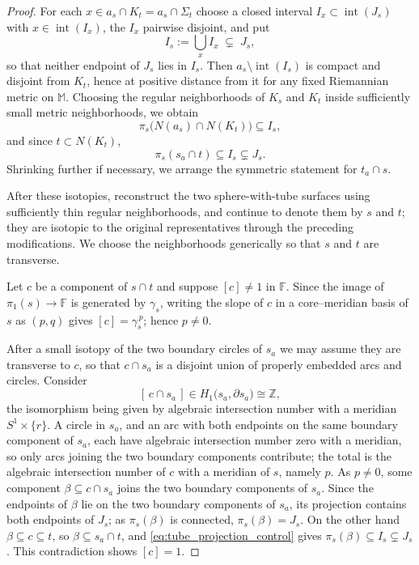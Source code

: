 \documentclass[10pt,a4paper]{amsart}
\newcommand{\FF}{\mathbb{F}}
\newcommand{\MM}{\mathbb{M}}
\newcommand{\ZZ}{\mathbb{Z}}
\begin{document}
\begin{proof}
    For each $x \in a_s \cap K_t = a_s \cap \Sigma_t$ choose a closed interval $I_x \subset \operatorname{int}(J_s)$ with $x \in \operatorname{int}(I_x)$, the $I_x$ pairwise disjoint, and put
    \[
        I_s := \bigcup_x I_x \;\subsetneq\; J_s ,
    \]
    so that neither endpoint of $J_s$ lies in $I_s$.
    Then $a_s \setminus \operatorname{int}(I_s)$ is compact and disjoint from $K_t$, hence at positive distance from it for any fixed Riemannian metric on $\MM$.
    Choosing the regular neighborhoods of $K_s$ and $K_t$ inside sufficiently small metric neighborhoods, we obtain
    \[
        \pi_s\bigl(N(a_s) \cap N(K_t)\bigr) \subseteq I_s ,
    \]
    and since $t \subset N(K_t)$,
    \begin{equation} \label{eq:tube_projection_control}
        \pi_s(s_a \cap t) \subseteq I_s \subsetneq J_s .
    \end{equation}
    Shrinking further if necessary, we arrange the symmetric statement for $t_a \cap s$.

    After these isotopies, reconstruct the two sphere-with-tube surfaces using sufficiently thin regular neighborhoods, and continue to denote them by $s$ and $t$; they are isotopic to the original representatives through the preceding modifications.
    We choose the neighborhoods generically so that $s$ and $t$ are transverse.

    Let $c$ be a component of $s \cap t$ and suppose $[c] \neq 1$ in $\FF$.
    Since the image of $\pi_1(s) \to \FF$ is generated by $\gamma_s$, writing the slope of $c$ in a core--meridian basis of $s$ as $(p,q)$ gives $[c] = \gamma_s^{\,p}$; hence $p \neq 0$.

    After a small isotopy of the two boundary circles of $s_a$ we may assume they are transverse to $c$, so that $c \cap s_a$ is a disjoint union of properly embedded arcs and circles.
    Consider
    \[
        [\,c \cap s_a\,] \in H_1\bigl(s_a, \partial s_a\bigr) \cong \ZZ ,
    \]
    the isomorphism being given by algebraic intersection number with a meridian $S^1 \times \{r\}$.
    A circle in $s_a$, and an arc with both endpoints on the same boundary component of $s_a$, each have algebraic intersection number zero with a meridian, so only arcs joining the two boundary components contribute; the total is the algebraic intersection number of $c$ with a meridian of $s$, namely $p$.
    As $p \neq 0$, some component $\beta \subseteq c \cap s_a$ joins the two boundary components of $s_a$.
    Since the endpoints of $\beta$ lie on the two boundary components of $s_a$, its projection contains both endpoints of $J_s$; as $\pi_s(\beta)$ is connected, $\pi_s(\beta) = J_s$.
    On the other hand $\beta \subseteq c \subseteq t$, so $\beta \subseteq s_a \cap t$, and \eqref{eq:tube_projection_control} gives $\pi_s(\beta) \subseteq I_s \subsetneq J_s$.
    This contradiction shows $[c] = 1$.


\end{proof}
\end{document}
